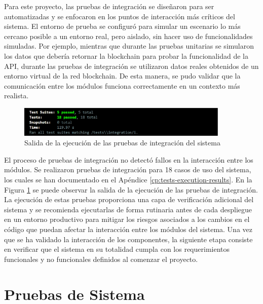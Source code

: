 Para este proyecto, las pruebas de integración se diseñaron para ser automatizadas y se enfocaron en los puntos de interacción más críticos del sistema. El entorno de prueba se configuró para simular un escenario lo más cercano posible a un entorno real, pero aislado, sin hacer uso de funcionalidades simuladas. Por ejemplo, mientras que durante las pruebas unitarias se simularon los datos que debería retornar la blockchain para probar la funcionalidad de la API, durante las pruebas de integración se utilizaron datos reales obtenidos de un entorno virtual de la red blockchain. De esta manera, se pudo validar que la comunicación entre los módulos funciona correctamente en un contexto más realista.

\begin{figure}[!htb]
	\centering
	\includegraphics[width=0.9\textwidth]{Figures/integration-test-results.png}
	\caption{Salida de la ejecución de las pruebas de integración del sistema}
	\label{fig:integration-test-results}
\end{figure}

El proceso de pruebas de integración no detectó fallos en la interacción entre los módulos. Se realizaron pruebas de integración para 18 casos de uso del sistema, los cuales se han documentado en el Apéndice \ref{cp:tests-execution-results}. En la Figura \ref{fig:integration-test-results} se puede observar la salida de la ejecución de las pruebas de integración. La ejecución de estas pruebas proporciona una capa de verificación adicional del sistema y se recomienda ejecutarlas de forma rutinaria antes de cada despliegue en un entorno productivo para mitigar los riesgos asociados a los cambios en el código que puedan afectar la interacción entre los módulos del sistema. Una vez que se ha validado la interacción de los componentes, la siguiente etapa consiste en verificar que el sistema en su totalidad cumpla con los requerimientos funcionales y no funcionales definidos al comenzar el proyecto.

\section{Pruebas de Sistema}
\label{sec:system-testing}


